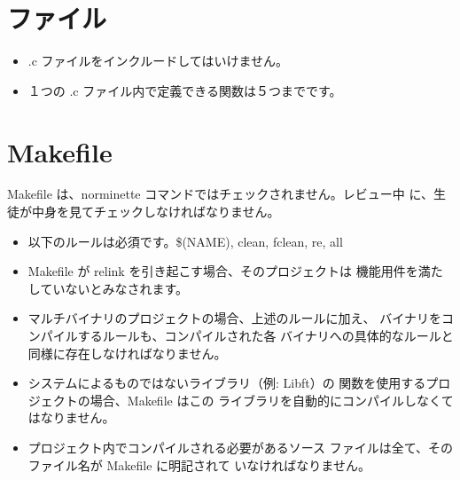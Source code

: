 \documentclass{42-ja}
\begin{document}
    \section{ファイル}

        \begin{itemize}

            \item .c ファイルをインクルードしてはいけません。

            \item １つの .c ファイル内で定義できる関数は５つまでです。

        \end{itemize}
        \newpage


    \section{Makefile}

            Makefile は、norminette コマンドではチェックされません。レビュー中
			に、生徒が中身を見てチェックしなければなりません。
            \begin{itemize}

                \item 以下のルールは必須です。\$(NAME), clean, fclean, re, all

                \item Makefile が relink を引き起こす場合、そのプロジェクトは
					機能用件を満たしていないとみなされます。

                \item マルチバイナリのプロジェクトの場合、上述のルールに加え、
					バイナリをコンパイルするルールも、コンパイルされた各
					バイナリへの具体的なルールと同様に存在しなければなりません。

                  \item システムによるものではないライブラリ（例: Libft）の
					  関数を使用するプロジェクトの場合、Makefile はこの
					  ライブラリを自動的にコンパイルしなくてはなりません。

                  \item プロジェクト内でコンパイルされる必要があるソース
					  ファイルは全て、そのファイル名が Makefile に明記されて
					  いなければなりません。

            \end{itemize}
\end{document}
